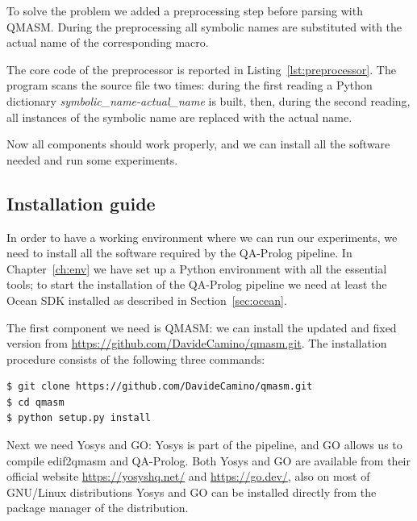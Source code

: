 {\begin{listingenv}[h]
	\caption{Preprocessor's core}
	\label{lst:preprocessor}
\end{listingenv}

To solve the problem we added a preprocessing step before parsing with QMASM. During the preprocessing all symbolic names are substituted with the actual name of the corresponding macro. 

The core code of the preprocessor is reported in Listing~\ref{lst:preprocessor}. The program scans the source file two times: during the first reading a Python dictionary \emph{symbolic\_name-actual\_name} is built, then, during the second reading, all instances of the symbolic name are replaced with the actual name.

Now all components should work properly, and we can install all the software needed and run some experiments.

\subsection{Installation guide}
In order to have a working environment where we can run our experiments, we need to install all the software required by the QA-Prolog pipeline. In Chapter~\ref{ch:env} we have set up a Python environment with all the essential tools; to start the installation of the QA-Prolog pipeline we need at least the Ocean SDK installed as described in Section~\ref{sec:ocean}.

The first component we need is QMASM: we can install the updated and fixed version from \url{https://github.com/DavideCamino/qmasm.git}. The installation procedure consists of the following three commands:
\begin{center}
	\vspace{-.1cm}
	\begin{minipage}{.8\linewidth}
		\begin{verbatim}
$ git clone https://github.com/DavideCamino/qmasm.git
$ cd qmasm
$ python setup.py install
		\end{verbatim}
	\end{minipage}
\end{center}

Next we need Yosys and GO: Yosys is part of the pipeline, and GO allows us to compile edif2qmasm and QA-Prolog. Both Yosys and GO are available from their official website \url{https://yosyshq.net/} and \url{https://go.dev/}, also on most of GNU/Linux distributions Yosys and GO can be installed directly from the package manager of the distribution.

}
